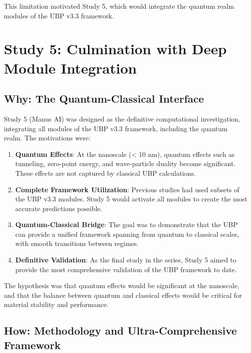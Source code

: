 \documentclass[11pt,a4paper]{article}
\begin{document}
This limitation motivated Study 5, which would integrate the quantum realm modules of the UBP v3.3 framework.

\section{Study 5: Culmination with Deep Module Integration}

\subsection{Why: The Quantum-Classical Interface}

Study 5 (Manus AI) was designed as the definitive computational investigation, integrating all modules of the UBP v3.3 framework, including the quantum realm. The motivations were:

\begin{enumerate}
    \item \textbf{Quantum Effects}: At the nanoscale (< 10 nm), quantum effects such as tunneling, zero-point energy, and wave-particle duality become significant. These effects are not captured by classical UBP calculations.
    
    \item \textbf{Complete Framework Utilization}: Previous studies had used subsets of the UBP v3.3 modules. Study 5 would activate all modules to create the most accurate predictions possible.
    
    \item \textbf{Quantum-Classical Bridge}: The goal was to demonstrate that the UBP can provide a unified framework spanning from quantum to classical scales, with smooth transitions between regimes.
    
    \item \textbf{Definitive Validation}: As the final study in the series, Study 5 aimed to provide the most comprehensive validation of the UBP framework to date.
\end{enumerate}

The hypothesis was that quantum effects would be significant at the nanoscale, and that the balance between quantum and classical effects would be critical for material stability and performance.

\subsection{How: Methodology and Ultra-Comprehensive Framework}
\end{document}
